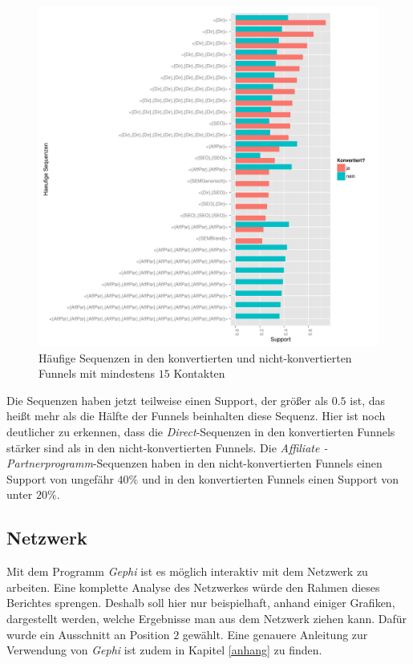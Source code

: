 \begin{figure}[H]
	\centering\includegraphics[scale=0.6]{spm_min15.pdf}\caption[Häufige Sequenzen in Funnels mit mindestens $15$ Kontaktpunkten]{Häufige Sequenzen in den konvertierten und nicht-konvertierten Funnels mit mindestens $15$ Kontakten}\label{spm_min15}
\end{figure}
Die Sequenzen haben jetzt teilweise einen Support, der größer als $0.5$ ist, das heißt mehr als die Hälfte der Funnels beinhalten diese Sequenz. Hier ist noch deutlicher zu erkennen, dass die \textit{Direct}-Sequenzen in den konvertierten Funnels stärker sind als in den nicht-konvertierten Funnels. Die \textit{Affiliate - Partnerprogramm}-Sequenzen haben in den nicht-konvertierten Funnels einen Support von ungefähr $40 \%$ und in den konvertierten Funnels einen Support von unter $20 \%$.\\

\subsection{Netzwerk}\label{resultsnetwork}

Mit dem Programm \textit{Gephi} ist es möglich interaktiv mit dem Netzwerk zu arbeiten. Eine komplette Analyse des Netzwerkes würde den Rahmen dieses Berichtes sprengen. Deshalb soll hier nur beispielhaft, anhand einiger Grafiken, dargestellt werden, welche Ergebnisse man aus dem Netzwerk ziehen kann. Dafür wurde ein Ausschnitt an Position $2$ gewählt. Eine genauere Anleitung zur Verwendung von \textit{Gephi} ist zudem in Kapitel \ref{anhang} zu finden.

